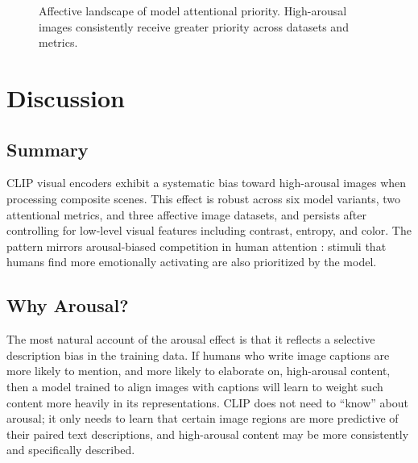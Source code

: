 \documentclass[12pt]{article}
\begin{document}
\begin{figure}[h]
\centering
{}
\caption{Affective landscape of model attentional priority. High-arousal images consistently receive greater priority across datasets and metrics.}
\label{fig:landscape}
\end{figure}

\section{Discussion}

\subsection{Summary}

CLIP visual encoders exhibit a systematic bias toward high-arousal images when processing composite scenes. This effect is robust across six model variants, two attentional metrics, and three affective image datasets, and persists after controlling for low-level visual features including contrast, entropy, and color. The pattern mirrors arousal-biased competition in human attention \citep{matherArousalBiasedCompetitionPerception2011, sutherlandArousalNotValence2018}: stimuli that humans find more emotionally activating are also prioritized by the model.

\subsection{Why Arousal?}

The most natural account of the arousal effect is that it reflects a selective description bias in the training data. If humans who write image captions are more likely to mention, and more likely to elaborate on, high-arousal content, then a model trained to align images with captions will learn to weight such content more heavily in its representations. CLIP does not need to ``know'' about arousal; it only needs to learn that certain image regions are more predictive of their paired text descriptions, and high-arousal content may be more consistently and specifically described.
\end{document}
